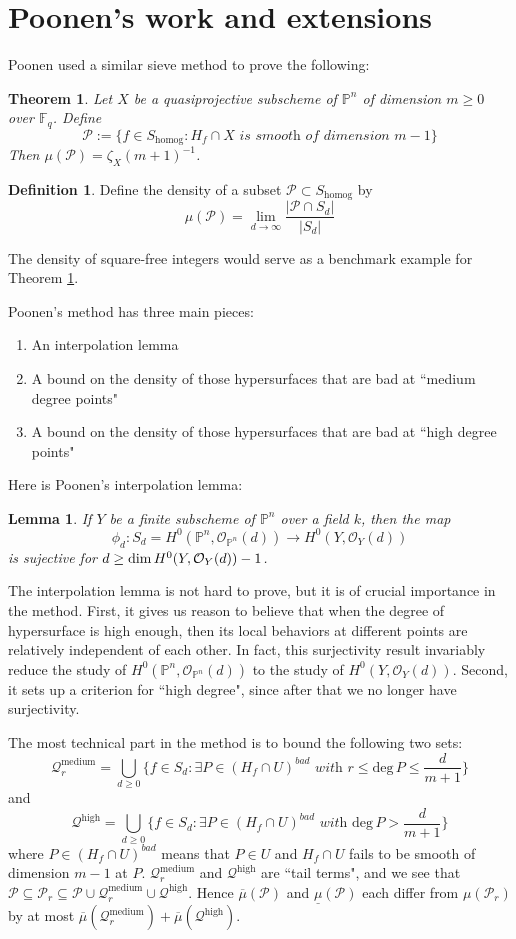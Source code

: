 \documentclass[12pt]{article}
\theoremstyle{plain}
\newtheorem{theorem}[equation]{Theorem}
\newtheorem{lemma}[equation]{Lemma}
\theoremstyle{definition}
\newtheorem{definition}[equation]{Definition}
\newcommand{\IF}{\mathbb{F}}
\newcommand{\IP}{\mathbb{P}}
\newcommand{\sO}{\mathcal{O}}
\newcommand{\sP}{\mathcal{P}}
\renewcommand{\deg}{\mathrm{deg}\,}
\renewcommand\dim{{\rm dim\,}}
\newcommand\union{\bigcup}
\newcommand{\<}{\langle}
\renewcommand{\>}{\rangle}
\newcommand{\Qmed}{\mathcal{Q}_r^\mathrm{medium}}
\newcommand{\Qhigh}{\mathcal{Q}^\mathrm{high}}
\newcommand{\uppermu}{\overline{\mu}}
\newcommand{\lowermu}{\underline{\mu}}
\begin{document}
\section{Poonen's work and extensions}
Poonen used a similar sieve method to prove the following:
\begin{theorem}
\label{Bertini}
Let $X$ be a quasiprojective subscheme of $\IP^n$ of dimension $m \ge 0$ over $\IF_q$. Define 
$$ \sP := \{ f \in S_{\mathrm{homog}} : H_f \cap X \textit{ is smooth of dimension }m-1 \}$$
Then $\mu(\sP) = \zeta_X(m + 1)^{-1}$. 
\end{theorem}
\begin{definition}
\label{Pdef}
Define the density of a subset $\sP \subset S_\mathrm{homog}$ by
$$\mu(\sP) = \lim_{d \to \infty} \frac{|\sP \cap S_d|}{|S_d|}$$
\end{definition}
The density of square-free integers would serve as a benchmark example for Theorem \ref{Bertini}. 

Poonen's method has three main pieces:
\begin{enumerate}
\item An interpolation lemma
\item A bound on the density of those hypersurfaces that are bad at ``medium degree points"
\item A bound on the density of those hypersurfaces that are bad at ``high degree points"
\end{enumerate}
Here is Poonen's interpolation lemma:
\begin{lemma}
\label{surj}
If $Y$ be a finite subscheme of $\IP^n$ over a field $k$, then the map 
$$ \phi_d : S_d = H^0(\IP^n, \sO_{\IP^n}(d)) \to H^0(Y, \sO_Y(d))$$
is sujective for $d \ge \dim H^0(Y, \sO_Y(d)) - 1$. 
\end{lemma}

The interpolation lemma is not hard to prove, but it is of crucial importance in the method. First, it gives us reason to believe that when the degree of hypersurface is high enough, then its local behaviors at different points are relatively independent of each other. In fact, this surjectivity result invariably reduce the study of $H^0(\IP^n, \sO_{\IP^n}(d))$ to the study of $H^0(Y, \sO_Y(d))$. Second, it sets up a criterion for ``high degree", since after that we no longer have surjectivity. 

The most technical part in the method is to bound the following two sets: 
$$\Qmed = \union_{d \ge 0} \{ f \in S_d : \textit{$\exists P \in (H_f \cap U)^{bad}$ with } r \le \deg P \le \frac{d}{m+1}\}$$
and 
$$\Qhigh = \union_{d \ge 0} \{ f \in S_d : \exists P \in (H_f \cap U)^{bad} \textit{ with } \deg P > \frac{d}{m+1} \}$$
where $P \in (H_f \cap U)^{bad}$ means that $P \in U$ and $H_f \cap U$ fails to be smooth of dimension $m - 1$ at $P$. $\Qmed$ and $\Qhigh$ are ``tail terms", and we see that $\sP \subseteq \sP_r \subseteq \sP \cup \Qmed \cup \Qhigh$. Hence $\uppermu(\sP)$ and $\lowermu(\sP)$ each differ from $\mu(\sP_r)$ by at most $\uppermu(\Qmed) + \uppermu(\Qhigh)$. 
\end{document}
